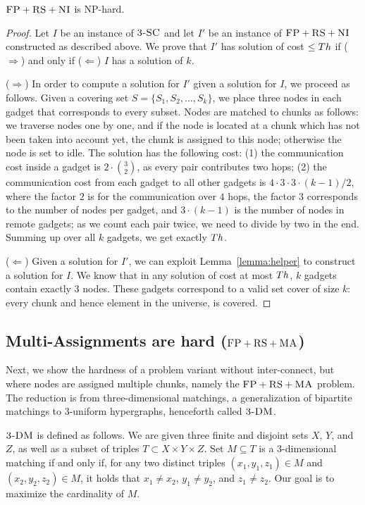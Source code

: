 \begin{theorem}
$\textsc{FP}+\textsc{RS}+\textsc{NI}$ is NP-hard.
\end{theorem}
\begin{proof}
Let $I$ be an instance of $\textsc{3-SC}$ and let $I'$ be an instance of
$\textsc{FP}+\textsc{RS}+\textsc{NI}$ constructed as described above.
We prove that $I'$ has solution of cost $\leq Th$ if ($\Rightarrow$) and only if
($\Leftarrow$)
$I$ has a solution of $k$.

($\Rightarrow$) In order to compute a solution
for $I'$ given a solution for $I$, we proceed as follows.
Given a covering set $S = \{S_1, S_2, \ldots, S_k\}$, we place three nodes in each gadget that
corresponds to every subset. Nodes are matched to chunks
as follows: we traverse nodes one by one, and if the node is
located at a chunk which has not been taken into account yet,
the chunk is assigned to this node; otherwise
the node is set to idle.
The solution has the following cost:
(1) the communication cost inside a gadget is $2 \cdot {3 \choose 2}$,
  as every pair contributes two hops;
  (2) the communication cost from each gadget to all other gadgets is $4
  \cdot 3 \cdot 3 \cdot (k - 1) / 2$, where the factor $2$ is
  for the
  communication over $4$ hops, the factor $3$
  corresponds to the number of nodes per gadget, and
  $3 \cdot (k-1)$ is the number of nodes in remote gadgets;
  as we count each pair twice, we need to divide by two in the end.
Summing up over all $k$ gadgets, we get exactly $Th$.

($\Leftarrow$) Given a solution for $I'$,
we can exploit Lemma~\ref{lemma:helper} to construct a solution for $I$.
We know that in any solution of cost at most $Th$,
$k$ gadgets contain exactly 3 nodes. These gadgets correspond to a valid
set cover of size $k$: every
chunk and hence element in the universe, is covered.
\end{proof}

\subsection{Multi-Assignments are hard ($\textsc{FP}+\textsc{RS}+\textsc{MA}$)}\label{ssec:fprsma}

Next, we show the hardness of a problem variant without inter-connect,
but where nodes are assigned multiple chunks, namely the $\textsc{FP}+\textsc{RS}+\textsc{MA}$
problem.
The reduction is from three-dimensional matchings, a generalization of bipartite matchings
to 3-uniform hypergraphs, henceforth called
$\textsc{3-DM}$.~\cite{3dmatch}

$\textsc{3-DM}$ is defined as follows. We are given three finite and disjoint sets $X$, $Y$, and $Z$,
as well as a subset of triples $T\subset X \times Y \times Z$.
Set $M \subseteq T$ is a 3-dimensional matching if and only if,
for any two distinct triples $(x_1, y_1, z_1) \in M$ and $(x_2, y_2, z_2) \in M$,
it holds that $x_1\neq x_2$, $y_1\neq y_2$, and $z_1\neq z_2$. Our goal is to
maximize the cardinality of $M$.

